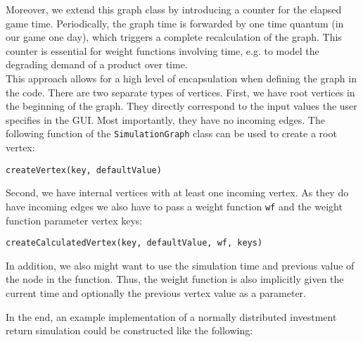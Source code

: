 Moreover, we extend this graph class by introducing a counter for the elapsed game time. Periodically, the graph time is forwarded by one time quantum (in our game one day), which triggers a complete recalculation of the graph. This counter is essential for weight functions involving time, e.g. to model the degrading demand of a product over time.
\\


This approach allows for a high level of encapsulation when defining the graph in the code. There are two separate types of vertices. First, we have root vertices in the beginning of the graph. They directly correspond to the input values the user specifies in the GUI. Most importantly, they have no incoming edges. The following function of the \texttt{SimulationGraph} class can be used to create a root vertex:

\begin{center}
	\texttt{createVertex(key, defaultValue)}
\end{center}

Second, we have internal vertices with at least one incoming vertex. As they do have incoming edges we also have to pass a weight function \texttt{wf} and the weight function parameter vertex keys:
\begin{center}
	\texttt{createCalculatedVertex(key, defaultValue, wf, keys)}
\end{center}
 
 In addition, we also might want to use the simulation time and previous value of the node in the function. Thus, the weight function is also implicitly given the current time and optionally the previous vertex value as a parameter.
 \newpage
 
 In the end, an example implementation of a normally distributed investment return simulation could be constructed like the following:\\
 
